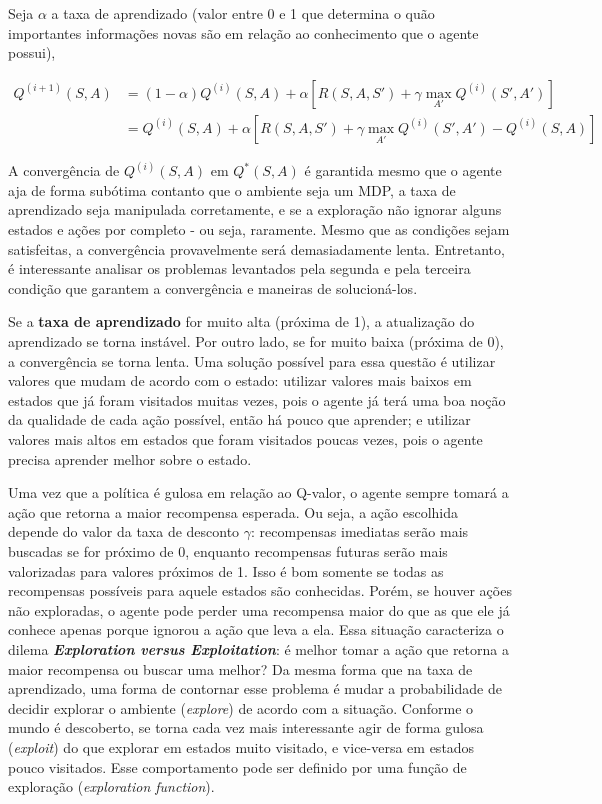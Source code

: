 Seja $\alpha$ a taxa de aprendizado (valor entre 0 e 1 que determina o quão importantes informações novas são em relação ao conhecimento que o agente possui),

\begin{equation} \label{eq:q_update}
\begin{align*}
Q^{(i+1)}(S,A) &= (1-\alpha)Q^{(i)}(S,A) + \alpha[R(S,A,S') + \gamma \max_{A'}Q^{(i)}(S',A')] \\
            &= Q^{(i)}(S,A) + \alpha[R(S,A,S') + \gamma \max_{A'}Q^{(i)}(S',A') - Q^{(i)}(S,A)]
\end{align*}
\end{equation}

A convergência de $Q^{(i)}(S,A)$ em $Q^{*}(S,A)$ é garantida mesmo que o agente aja de forma subótima contanto que o ambiente seja um MDP, a taxa de aprendizado seja manipulada corretamente, e se a exploração não ignorar alguns estados e ações por completo - ou seja, raramente.
Mesmo que as condições sejam satisfeitas, a convergência provavelmente será demasiadamente lenta.
Entretanto, é interessante analisar os problemas levantados pela segunda e pela terceira condição que garantem a convergência e maneiras de solucioná-los.

Se a \textbf{taxa de aprendizado} for muito alta (próxima de 1), a atualização do aprendizado se torna instável.
Por outro lado, se for muito baixa (próxima de 0), a convergência se torna lenta.
Uma solução possível para essa questão é utilizar valores que mudam de acordo com o estado: utilizar valores mais baixos em estados que já foram visitados muitas vezes, pois o agente já terá uma boa noção da qualidade de cada ação possível, então há pouco que aprender; e utilizar valores mais altos em estados que foram visitados poucas vezes, pois o agente precisa aprender melhor sobre o estado.

Uma vez que a política é gulosa em relação ao Q-valor, o agente sempre tomará a ação que retorna a maior recompensa esperada.
Ou seja, a ação escolhida depende do valor da taxa de desconto $\gamma$: recompensas imediatas serão mais buscadas se for próximo de 0, enquanto recompensas futuras serão mais valorizadas para valores próximos de 1.
Isso é bom somente se todas as recompensas possíveis para aquele estados são conhecidas.
Porém, se houver ações não exploradas, o agente pode perder uma recompensa maior do que as que ele já conhece apenas porque ignorou a ação que leva a ela.
Essa situação caracteriza o dilema \textbf{\textit{Exploration versus Exploitation}}: é melhor tomar a ação que retorna a maior recompensa ou buscar uma melhor?
Da mesma forma que na taxa de aprendizado, uma forma de contornar esse problema é mudar a probabilidade de decidir explorar o ambiente (\textit{explore}) de acordo com a situação.
Conforme o mundo é descoberto, se torna cada vez mais interessante agir de forma gulosa (\textit{exploit}) do que explorar em estados muito visitado, e vice-versa em estados pouco visitados.
Esse comportamento pode ser definido por uma função de exploração (\textit{exploration function}).

